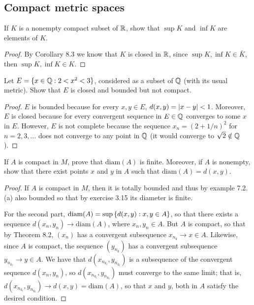 \subsection{Compact metric spaces}


\begin{exercise}{1}
If $K$ is a nonempty compact subset of $\mathbb{R}$, show that $\sup K$ and $\inf K$ are elements of $K$.
\end{exercise}
\begin{proof}
By Corollary 8.3 we know that $K$ is closed in $\mathbb{R}$, since $\sup K,\inf K\in \bar{K}$, then $\sup K, \inf K\in K$.
\end{proof} 

\begin{exercise}{2}
Let $E=\{x\in\mathbb{Q}: 2<x^2<3\}$, considered as a subset of $\mathbb{Q}$ (with its usual metric).
Show that $E$ is closed and bounded but not compact.
\end{exercise}
\begin{proof}
$E$ is bounded because for every $x,y\in E$, $d(x,y)=\left\lvert x-y\right\rvert<1$.
Moreover, $E$ is closed because for every convergent sequence in $E\in\mathbb{Q}$ converges to some $x$ in $E$.
However, $E$ is not complete because the sequence $x_n = (2+1/n)^2$ for $n=2,3,\dots$ does not converge to any point in $\mathbb{Q}$ (it would converge to $\sqrt{2}\notin \mathbb{Q}$).
\end{proof} 

\begin{exercise}{3}
If $A$ is compact in $M$, prove that $\text{diam}(A)$ is finite.
Moreover, if $A$ is nonempty, show that there exist points $x$ and $y$ in $A$ such that $\text{diam}(A)=d(x,y)$.
\end{exercise}
\begin{proof}
If $A$ is compact in $M$, then it is totally bounded and thus by example 7.2.(a) also bounded so that by exercise 3.15 its diameter is finite.

For the second part, $\text{diam}(A)=\sup{\{d(x,y):x,y\in A\}}$, so that there exists a sequence $d(x_n,y_n)\to \text{diam}(A)$, where $x_n,y_n\in A$.
But $A$ is compact, so that by Theorem 8.2, $(x_n)$ has a convergent subsequence $x_{n_k}\to x\in A$.
Likewise, since $A$ is compact, the sequence $(y_{n_k})$ has a convergent subsequence $y_{n_{k_l}}\to y \in A$.
We have that $d(x_{n_{k_l}}, y_{n_{k_l}})$ is a subsequence of the convergent sequence $d(x_n,y_n)$, so $d(x_{n_{k_l}}, y_{n_{k_l}})$ must converge to the same limit;
that is, $d(x_{n_{k_l}}, y_{n_{k_l}}) \to d(x,y) = \text{diam}(A)$, so that $x$ and $y$, both in $A$ satisfy the desired condition. 
\end{proof} 

